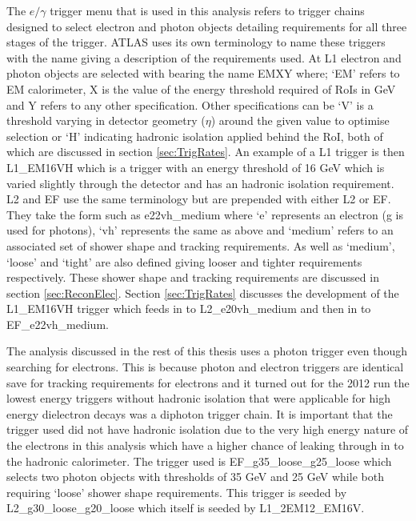 		The $e/\gamma$ trigger menu that is used in this analysis refers to trigger chains designed to select electron and photon objects detailing requirements for all three stages of the trigger. ATLAS uses its own terminology to name these triggers with the name giving a description of the requirements used. At L1 electron and photon objects are selected with bearing the name EMXY where; `EM' refers to EM calorimeter, X is the value of the energy threshold required of RoIs in GeV and Y refers to any other specification. Other specifications can be `V' is a threshold varying in detector geometry ($\eta$) around the given value to optimise selection or `H' indicating hadronic isolation applied behind the RoI, both of which are discussed in section \ref{sec:TrigRates}. An example of a L1 trigger is then L1\_EM16VH which is a trigger with an energy threshold of 16 GeV which is varied slightly through the detector and has an hadronic isolation requirement. L2 and EF use the same terminology but are prepended with either L2 or EF. They take the form such as e22vh\_medium where `e' represents an electron (g is used for photons), `vh' represents the same as above and `medium' refers to an associated set of shower shape and tracking requirements. As well as `medium', `loose' and `tight' are also defined giving looser and tighter requirements respectively. These shower shape and tracking requirements are discussed in section \ref{sec:ReconElec}. Section \ref{sec:TrigRates} discusses the development of the L1\_EM16VH trigger which feeds in to L2\_e20vh\_medium and then in to EF\_e22vh\_medium. 

		The analysis discussed in the rest of this thesis uses a photon trigger even though searching for electrons. This is because photon and electron triggers are identical save for tracking requirements for electrons and it turned out for the 2012 run the lowest energy triggers without hadronic isolation that were applicable for high energy dielectron decays was a diphoton trigger chain. It is important that the trigger used did not have hadronic isolation due to the very high energy nature of the electrons in this analysis which have a higher chance of leaking through in to the hadronic calorimeter. The trigger used is EF\_g35\_loose\_g25\_loose which selects two photon objects with thresholds of 35 GeV and 25 GeV while both requiring `loose' shower shape requirements. This trigger is seeded by L2\_g30\_loose\_g20\_loose which itself is seeded by L1\_2EM12\_EM16V.



